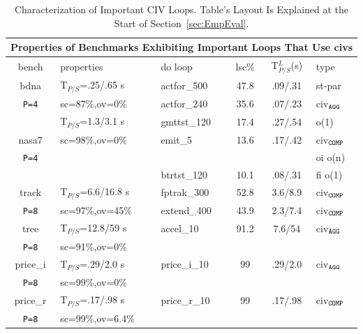 \documentclass{sig-alternate}
\begin{document}
\begin{table}[t] 
\centering
\scriptsize   
\begin{tabular}{|c|l|l|c|c|l|} \hline
\multicolumn{6}{|c|}{Properties of Benchmarks Exhibiting Important Loops That Use {\sc civ}s} \\ \hline
{\sc bench} & {\sc properties} & {\sc do loop}  & {\sc lsc}\%  & T$_{P/S}^L$(s) & {\sc type} \\ \hline
{\sc bdna}  &  T$_{P/S}$=.25/.65 s         & {\sc actfor\_500}  & 47.8 & .09/.31 & {\sc st-par}     \\ 
{\tt P=4}         &  {\sc sc}=87\%,{\sc ov}=0\%  & {\sc actfor\_240}  & 35.6 & .07/.23 & {\sc civ}$_{\tt{}AGG}$    \\ \hline 
             &  T$_{P/S}$=1.3/3.1 s         & {\sc gmttst\_120}  & 17.4 & .27/.54 & {\sc {\sc fi} {\sc o(1)}}   \\ 
{\sc nasa7}  &  {\sc sc}=98\%,{\sc ov}=0\%  & {\sc emit\_5}      & 13.6 & .17/.42 & {\sc civ}$_{\tt{}COMP}$   \\  %
{\tt P=4}        &                              &                      &                & & {\sc oi} {\sc o(n)}       \\
             &                              & {\sc btrtst\_120}  & 10.1 & .08/.31 & {\sc fi} {\sc o(1)}        \\ \hline
{\sc track}  &  T$_{P/S}$=6.6/16.8 s         & {\sc fptrak\_300}  & 52.8 & 3.6/8.9 & {\sc civ}$_{\tt{}COMP}$   \\ 
{\tt P=8}        &  {\sc sc}=97\%,{\sc ov}=45\%  & {\sc extend\_400}  & 43.9 & 2.3/7.4 & {\sc civ}$_{\tt{}COMP}$ \\ \hline 
{\sc tree}   &  T$_{P/S}$=12.8/59 s        & {\sc accel\_10}    & 91.2 & 7.6/54 & {\sc civ}$_{\tt{}AGG}$  \\            %
{\tt P=8}        &  {\sc sc}=91\%,{\sc ov}=0\% &                    &      &          &                           \\ \hline 
{\sc price\_i} &  T$_{P/S}$=.29/2.0 s        & {\sc price\_i\_10} & 99   & .29/2.0  & {\sc civ}$_{\tt{}AGG}$ \\ 
{\tt P=8}          &  {\sc sc}=99\%,{\sc ov}=0\% &                    &      &          &                           \\ \hline 
{\sc price\_r} &  T$_{P/S}$=.17/.98 s          & {\sc price\_r\_10}& 99   & .17/.98  & {\sc civ}$_{\tt{}COMP}$ \\ 
{\tt P=8}          &  {\sc sc}=99\%,{\sc ov}=6.4\% &                  &      &          &                          \\ \hline 
\end{tabular}
\caption{ Characterization of Important CIV Loops.
            Table's Layout Is Explained at the Start of Section~\ref{sec:EmpEval}. 
}
\label{tab:LoopBenchProps}
\end{table}
\end{document}

